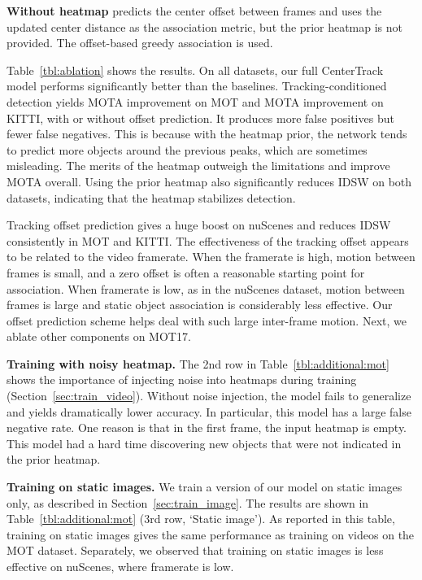 \documentclass[runningheads]{llncs}
\newcommand{\refsec}[1]{Section~\ref{sec:#1}}
\newcommand{\reftab}[1]{Table~\ref{tbl:#1}}
\renewcommand{\paragraph}[1]{\noindent\textbf{#1}}
\begin{document}
\paragraph{Without heatmap} predicts the center offset between frames and uses the updated center distance as the association metric, but the prior heatmap is not provided. The offset-based greedy association is used.

\reftab{ablation} shows the results.
On all datasets, our full CenterTrack model performs significantly better than the baselines.
Tracking-conditioned detection yields  MOTA improvement on MOT and  MOTA improvement on KITTI, with or without offset prediction. 
It produces more false positives but fewer false negatives. 
This is because with the heatmap prior, the network tends to predict more objects around the previous peaks, which are sometimes misleading.
The merits of the heatmap outweigh the limitations and improve MOTA overall.
Using the prior heatmap also significantly reduces IDSW on both datasets, indicating that the heatmap stabilizes detection.


Tracking offset prediction gives a huge boost on nuScenes and reduces IDSW consistently in MOT and KITTI.
The effectiveness of the tracking offset appears to be related to the video framerate.
When the framerate is high, motion between frames is small, and a zero offset is often a reasonable starting point for association.
When framerate is low, as in the nuScenes dataset, motion between frames is large and static object association is considerably less effective. Our offset prediction scheme helps deal with such large inter-frame motion.
Next, we ablate other components on MOT17.

\paragraph{Training with noisy heatmap.} The 2nd row in \reftab{additional:mot} shows the importance of injecting noise into heatmaps during training (\refsec{train_video}). Without noise injection, the model fails to generalize and yields dramatically lower accuracy. In particular, this model has a large false negative rate. One reason is that in the first frame, the input heatmap is empty. This model had a hard time discovering new objects that were not indicated in the prior heatmap.

\paragraph{Training on static images.}
We train a version of our model on static images only, as described in \refsec{train_image}.
The results are shown in \reftab{additional:mot} (3rd row, `Static image'). 
As reported in this table, training on static images gives the same performance as training on videos on the MOT dataset.
Separately, we observed that training on static images is less effective on nuScenes, where framerate is low.
\end{document}
